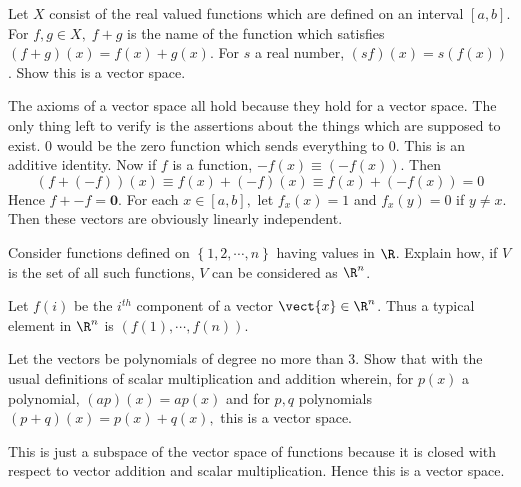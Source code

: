\begin{enumialphparenastyle}
\begin{ex} \label{4julyprob1}Let $X$ consist of the real valued functions which
are defined on an interval $\left[ a,b\right] .$ For $f,g\in X,\;f+g$ is the
name of the function which satisfies $\left( f+g\right) \left( x\right)
=f\left( x\right) +g\left( x\right)$. For $s$ a real number, $
\left( s f\right) \left( x\right) = s \left( f\left( x\right)
\right) $. Show this is a vector space. 
\begin{sol}
The axioms of a vector space all hold because they
hold for a vector space. The only thing left to verify is the
assertions about the things which are supposed to exist. $0$ would
be the zero function which sends everything to $0$. This is an additive
identity. Now if $f$ is a function, $-f\left( x\right) \equiv \left(
-f\left( x\right) \right) $. Then
\[
\left( f+\left( -f\right) \right) \left( x\right) \equiv f\left( x\right)
+\left( -f\right) \left( x\right) \equiv f\left( x\right) +\left( -f\left(
x\right) \right) =0
\]
Hence $f+-f=\mathbf{0}$. For each $x\in \left[ a,b\right] ,$ let $%
f_{x}\left( x\right) =1$ and $f_{x}\left( y\right) =0$ if $y\neq x.$ Then
these vectors are obviously linearly independent.
\end{sol}
\end{ex}

\begin{ex} Consider functions defined on $\left\{ 1,2,\cdots ,n\right\} $ having
values in $\R$. Explain how, if $V$ is the set of all such
functions, $V$ can be considered as $\R^{n}$.
\begin{sol}
Let $f\left( i\right) $ be the $i^{th}$ component of a vector $
\vect{x}\in \R^{n}$. Thus a typical element in $\R^{n}$ is $
\left( f\left( 1\right) ,\cdots ,f\left( n\right) \right) $.
\end{sol}
\end{ex}

\begin{ex} Let the vectors be polynomials of degree no more than 3. Show that
with the usual definitions of scalar multiplication and addition wherein,
for $p\left( x\right) $ a polynomial, $\left( a p\right) \left(
x\right) = a p\left( x\right) $ and for $p,q$ polynomials $\left(
p+q\right) \left( x\right) =  p\left( x\right) +q\left( x\right) ,$ this
is a vector space.
\begin{sol}
This is just a subspace of the vector space of functions
because it is closed with respect to vector addition and scalar
multiplication. Hence this is a vector space.
\end{sol}
\end{ex}

\end{enumialphparenastyle}

